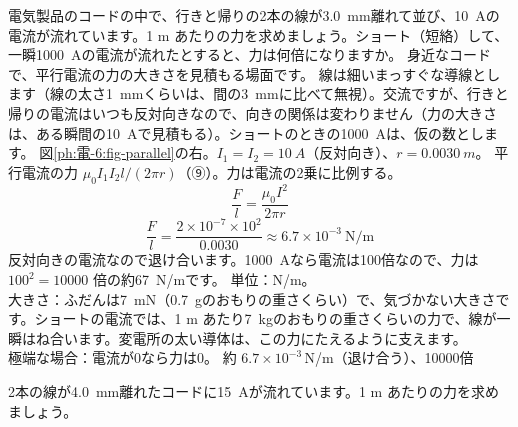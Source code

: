 \label{ph:電-6:ex7}
\begin{phreidai}
電気製品のコードの中で、行きと帰りの2本の線が\qty{3.0}{mm}離れて並び、\qty{10}{A}の電流が流れています。1 m あたりの力を求めましょう。ショート（短絡）して、一瞬\qty{1000}{A}の電流が流れたとすると、力は何倍になりますか。
\phbamen
身近なコードで、平行電流の力の大きさを見積もる場面です。
\phmushi
線は細いまっすぐな導線とします（線の太さ\qty{1}{mm}くらいは、間の\qty{3}{mm}に比べて無視）。交流ですが、行きと帰りの電流はいつも反対向きなので、向きの関係は変わりません（力の大きさは、ある瞬間の\qty{10}{A}で見積もる）。ショートのときの\qty{1000}{A}は、仮の数とします。
\phzu
図\ref{ph:電-6:fig-parallel}の右。$I_1=I_2=\qty{10}{A}$（反対向き）、$r=\qty{0.0030}{m}$。
\phriyu
平行電流の力 $\mu_0I_1I_2l/(2\pi r)$（⑨）。力は電流の2乗に比例する。
\phtateru
\[\frac{F}{l}=\frac{\mu_0I^2}{2\pi r}\]
\phtoku
\[\frac{F}{l}=\frac{2\times10^{-7}\times10^2}{0.0030}\approx6.7\times10^{-3}\ \text{N/m}\]
反対向きの電流なので退け合います。\qty{1000}{A}なら電流は100倍なので、力は $100^2=\num{10000}$ 倍の約\qty{67}{N/m}です。
\phtashikame
単位：N/m。\\
大きさ：ふだんは\qty{7}{mN}（\qty{0.7}{g}のおもりの重さくらい）で、気づかない大きさです。ショートの電流では、1 m あたり\qty{7}{kg}のおもりの重さくらいの力で、線が一瞬はね合います。変電所の太い導体は、この力にたえるように支えます。\\
極端な場合：電流が0なら力は0。
\kotae 約 $6.7\times10^{-3}$\,N/m（退け合う）、\num{10000}倍
\end{phreidai}
\begin{jibun}
2本の線が\qty{4.0}{mm}離れたコードに\qty{15}{A}が流れています。1 m あたりの力を求めましょう。
\end{jibun}

